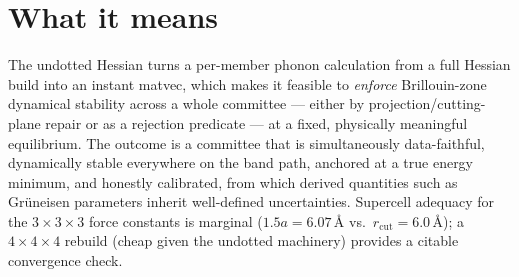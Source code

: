 \documentclass[11pt]{article}
\begin{document}
\section{What it means}
The undotted Hessian turns a per-member phonon calculation from a full Hessian
build into an instant matvec, which makes it feasible to \emph{enforce}
Brillouin-zone dynamical stability across a whole committee --- either by
projection/cutting-plane repair or as a rejection predicate --- at a fixed,
physically meaningful equilibrium. The outcome is a committee that is
simultaneously data-faithful, dynamically stable everywhere on the band path,
anchored at a true energy minimum, and honestly calibrated, from which
derived quantities such as Gr\"uneisen parameters inherit well-defined
uncertainties. Supercell adequacy for the $3\times3\times3$ force constants is
marginal ($1.5a = 6.07$\,\AA{} vs.\ $r_{\mathrm{cut}}=6.0$\,\AA); a
$4\times4\times4$ rebuild (cheap given the undotted machinery) provides a
citable convergence check.
\end{document}
